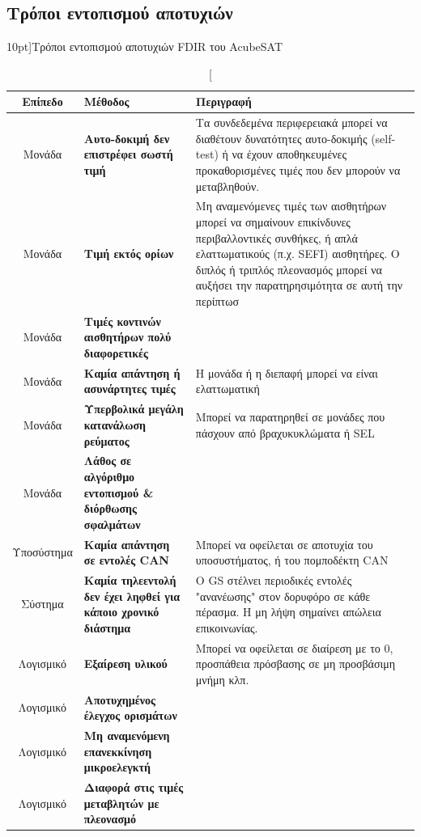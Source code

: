 \documentclass[a4paper,nobib]{tufte-book}
\begin{document}
\subsection{Τρόποι εντοπισμού αποτυχιών}
\begin{table}[h]
	\centering
	\caption[][10pt]{Τρόποι εντοπισμού αποτυχιών \acs{FDIR} του AcubeSAT}
	\label{tab:fdir_detect}
	\renewcommand{\arraystretch}{1.3}
	\begin{tabularx}{\textwidth}{@{}cL{5cm}X@{}}
		\toprule
		Επίπεδο & Μέθοδος & Περιγραφή \\ \midrule
		Μονάδα & \textbf{Αυτο-δοκιμή δεν επιστρέφει σωστή τιμή} & Τα συνδεδεμένα περιφερειακά μπορεί να διαθέτουν δυνατότητες αυτο-δοκιμής (self-test) ή να έχουν αποθηκευμένες προκαθορισμένες τιμές που δεν μπορούν να μεταβληθούν. \\
		Μονάδα & \textbf{Τιμή εκτός ορίων} & Μη αναμενόμενες τιμές των αισθητήρων μπορεί να σημαίνουν επικίνδυνες περιβαλλοντικές συνθήκες, ή απλά ελαττωματικούς (π.χ. \acs{SEFI}) αισθητήρες. Ο διπλός ή τριπλός πλεονασμός μπορεί να αυξήσει την παρατηρησιμότητα σε αυτή την περίπτωσ \\
		Μονάδα & \textbf{Τιμές κοντινών αισθητήρων πολύ διαφορετικές} &  \\
		Μονάδα & \textbf{Καμία απάντηση ή ασυνάρτητες τιμές} & Η μονάδα ή η διεπαφή μπορεί να είναι ελαττωματική \\
		Μονάδα & \textbf{Υπερβολικά μεγάλη κατανάλωση ρεύματος} & Μπορεί να παρατηρηθεί σε μονάδες που πάσχουν από βραχυκυκλώματα ή \acs{SEL} \\
		Μονάδα & \textbf{Λάθος σε αλγόριθμο εντοπισμού \& διόρθωσης σφαλμάτων} &  \\
		Υποσύστημα & \textbf{Καμία απάντηση σε εντολές \acs{CAN}} & Μπορεί να οφείλεται σε αποτυχία του υποσυστήματος, ή του πομποδέκτη \acs{CAN} \\
		Σύστημα & \textbf{Καμία τηλεεντολή δεν έχει ληφθεί για κάποιο χρονικό διάστημα} & Ο \acs{GS} στέλνει περιοδικές εντολές "ανανέωσης" στον δορυφόρο σε κάθε πέρασμα. Η μη λήψη σημαίνει απώλεια επικοινωνίας. \\
		Λογισμικό & \textbf{Εξαίρεση υλικού} & Μπορεί να οφείλεται σε διαίρεση με το 0, προσπάθεια πρόσβασης σε μη προσβάσιμη μνήμη κλπ. \\
		Λογισμικό & \textbf{Αποτυχημένος έλεγχος ορισμάτων} &  \\
		Λογισμικό & \textbf{Μη αναμενόμενη επανεκκίνηση μικροελεγκτή} &  \\
		Λογισμικό & \textbf{Διαφορά στις τιμές μεταβλητών με πλεονασμό} &  \\ \bottomrule
	\end{tabularx}
\end{table}
\end{document}
